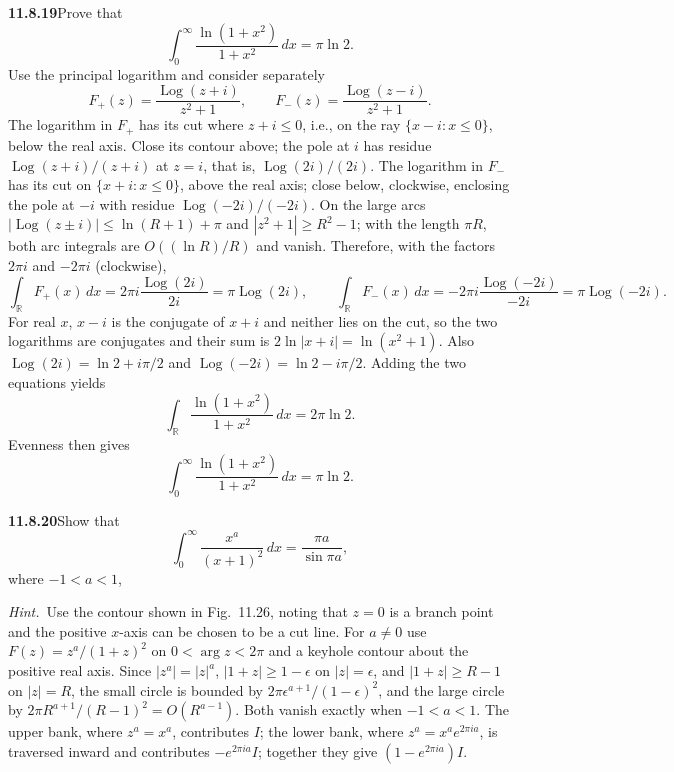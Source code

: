 \par\bigskip
\noindent\textbf{11.8.19}\quad Prove that
\[
\int_{0}^{\infty}\frac{\ln(1+x^{2})}{1+x^{2}}\,dx=\pi\ln2.
\]
\solution
Use the principal logarithm and consider separately
\[
F_+(z)=\frac{\operatorname{Log}(z+i)}{z^2+1},\qquad
F_-(z)=\frac{\operatorname{Log}(z-i)}{z^2+1}.
\]
The logarithm in $F_+$ has its cut where $z+i\le0$, i.e., on the ray
$\{x-i:x\le0\}$, below the real axis. Close its contour above;
the pole at $i$ has residue $\operatorname{Log}(z+i)/(z+i)$ at $z=i$,
that is, $\operatorname{Log}(2i)/(2i)$.
The logarithm in $F_-$ has its cut on $\{x+i:x\le0\}$, above the real
axis; close below, clockwise, enclosing the pole at $-i$ with residue
$\operatorname{Log}(-2i)/(-2i)$. On the large arcs
$|\operatorname{Log}(z\pm i)|\le\ln(R+1)+\pi$ and
$|z^2+1|\ge R^2-1$; with the length $\pi R$, both arc integrals are
$O((\ln R)/R)$ and vanish. Therefore, with the factors $2\pi i$ and
$-2\pi i$ (clockwise),
\[
\int_{\mathbb R}F_+(x)\,dx=2\pi i\frac{\operatorname{Log}(2i)}{2i}
=\pi\operatorname{Log}(2i),\qquad
\int_{\mathbb R}F_-(x)\,dx=-2\pi i\frac{\operatorname{Log}(-2i)}{-2i}
=\pi\operatorname{Log}(-2i).
\]
For real $x$, $x-i$ is the conjugate of $x+i$ and neither lies on the
cut, so the two logarithms are conjugates and their sum is
$2\ln|x+i|=\ln(x^2+1)$. Also
$\operatorname{Log}(2i)=\ln2+i\pi/2$ and
$\operatorname{Log}(-2i)=\ln2-i\pi/2$. Adding the two equations yields
\[
\int_{\mathbb R}\frac{\ln(1+x^2)}{1+x^2}\,dx=2\pi\ln2.
\]
Evenness then gives
\[
\boxed{\int_0^\infty\frac{\ln(1+x^2)}{1+x^2}\,dx=\pi\ln2}.
\]

\par\bigskip
\noindent\textbf{11.8.20}\quad Show that
\[
\int_{0}^{\infty}\frac{x^{a}}{(x+1)^{2}}\,dx=\frac{\pi a}{\sin\pi a},
\]
where $-1 < a < 1$, 

\emph{Hint.}~Use the contour shown in Fig.~11.26, noting that $z=0$ is a
branch point and the positive $x$-axis can be chosen to be a cut line.
\solution
For $a\ne0$ use $F(z)=z^a/(1+z)^2$ on $0<\arg z<2\pi$ and a
keyhole contour about the positive real axis. Since $|z^a|=|z|^a$,
$|1+z|\ge1-\epsilon$ on $|z|=\epsilon$, and $|1+z|\ge R-1$ on $|z|=R$,
the small circle is bounded by $2\pi\epsilon^{a+1}/(1-\epsilon)^2$,
and the large circle by $2\pi R^{a+1}/(R-1)^2=O(R^{a-1})$. Both vanish
exactly when $-1<a<1$. The upper bank, where $z^a=x^a$, contributes
$I$; the lower bank, where $z^a=x^ae^{2\pi ia}$, is traversed inward
and contributes $-e^{2\pi ia}I$; together they give
$(1-e^{2\pi ia})I$.


